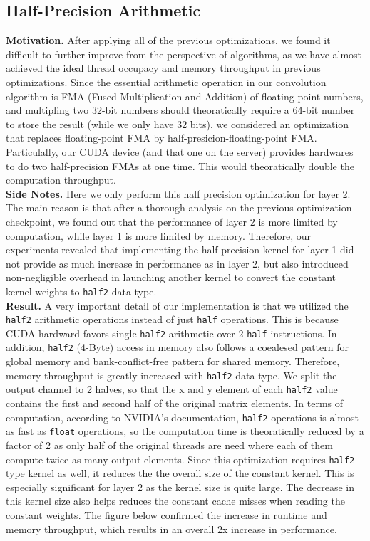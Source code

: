 \documentclass{article}
\begin{document}
\subsection{Half-Precision Arithmetic}
\textbf{Motivation.} After applying all of the previous optimizations, we found
it difficult to further improve from the perspective of algorithms, as we have
almost achieved the ideal thread occupacy and memory throughput in previous
optimizations. Since the essential arithmetic operation in our convolution
algorithm is FMA (Fused Multiplication and Addition) of floating-point numbers,
and multipling two 32-bit numbers should theoratically require a 64-bit number
to store the result (while we only have 32 bits), we considered an optimization
that replaces floating-point FMA by half-presicion-floating-point FMA. Particulally,
our CUDA device (and that one on the server) provides hardwares to do two
half-precision FMAs at one time. This would theoratically double the computation
throughput.\\

\textbf{Side Notes.} Here we only perform this half precision optimization for
layer 2. The main reason is that after a thorough analysis on the previous optimization
checkpoint, we found out that the performance of layer 2 is more limited by computation,
while layer 1 is more limited by memory. Therefore, our experiments revealed that implementing the half precision kernel
for layer 1 did not provide as much increase in performance as in layer 2, but also
introduced non-negligible overhead in launching another kernel to convert the constant
kernel weights to \verb|half2| data type.\\

\textbf{Result.} A very important detail of our implementation is that we utilized
the \verb|half2| arithmetic operations instead of just \verb|half| operations. This is because
CUDA hardward favors single \verb|half2| arithmetic over 2 \verb|half| instructions. In addition,
\verb|half2| (4-Byte) access in memory also follows a coealesed pattern for global memory
and bank-conflict-free pattern for shared memory. Therefore, memory throughput is
greatly increased with \verb|half2| data type. We split the output channel to 2 halves, so that
the x and y element of each \verb|half2| value contains the first and second half of the original
matrix elements. In terms of computation, according to NVIDIA's
documentation, \verb|half2| operations is almost as fast as \verb|float|
operations, so the computation time is theoratically reduced by a factor of 2 as only
half of the original threads are need where each of them compute twice as many output
elements. Since this optimization requires \verb|half2| type kernel as well, it
reduces the the overall size of the constant kernel. This is especially significant for layer 2
as the kernel size is quite large. The decrease in this kernel size also helps reduces the
constant cache misses when reading the constant weights.
The figure below confirmed the increase in runtime and memory throughput,
which results in an overall 2x increase in performance.
\end{document}
